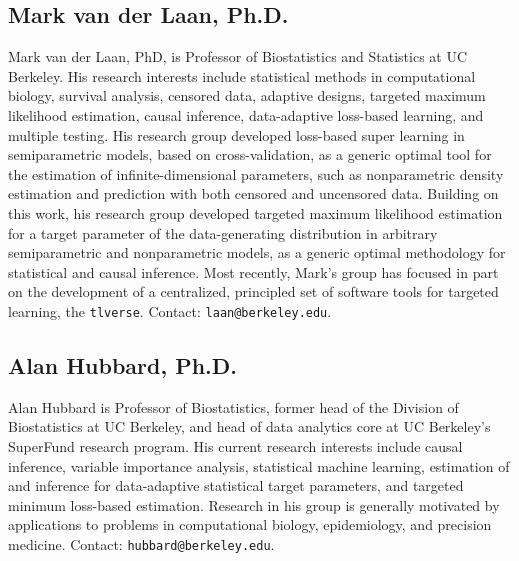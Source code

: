 \documentclass[a4paper,11pt]{texMemo}
\begin{document}
\subsection*{Mark van der Laan, Ph.D.}

\vspace{-.5em}

Mark van der Laan, PhD, is Professor of Biostatistics and Statistics at UC
Berkeley. His research interests include statistical methods in computational
biology, survival analysis, censored data, adaptive designs, targeted maximum
likelihood estimation, causal inference, data-adaptive loss-based learning, and
multiple testing. His research group developed loss-based super learning in
semiparametric models, based on cross-validation, as a generic optimal tool for
the estimation of infinite-dimensional parameters, such as nonparametric density
estimation and prediction with both censored and uncensored data. Building on
this work, his research group developed targeted maximum likelihood estimation
for a target parameter of the data-generating distribution in arbitrary
semiparametric and nonparametric models, as a generic optimal methodology for
statistical and causal inference. Most recently, Mark's group has focused in
part on the development of a centralized, principled set of software tools for
targeted learning, the \texttt{tlverse}. Contact: \texttt{laan@berkeley.edu}.

\vspace{-.5em}

\subsection*{Alan Hubbard, Ph.D.}

\vspace{-.5em}

Alan Hubbard is Professor of Biostatistics, former head of the Division of
Biostatistics at UC Berkeley, and head of data analytics core at UC Berkeley's
SuperFund research program. His current research interests include causal
inference, variable importance analysis, statistical machine learning,
estimation of and inference for data-adaptive statistical target parameters, and
targeted minimum loss-based estimation. Research in his group is generally
motivated by applications to problems in computational biology, epidemiology,
and precision medicine. Contact: \texttt{hubbard@berkeley.edu}.

\vspace{-.5em}
\end{document}
